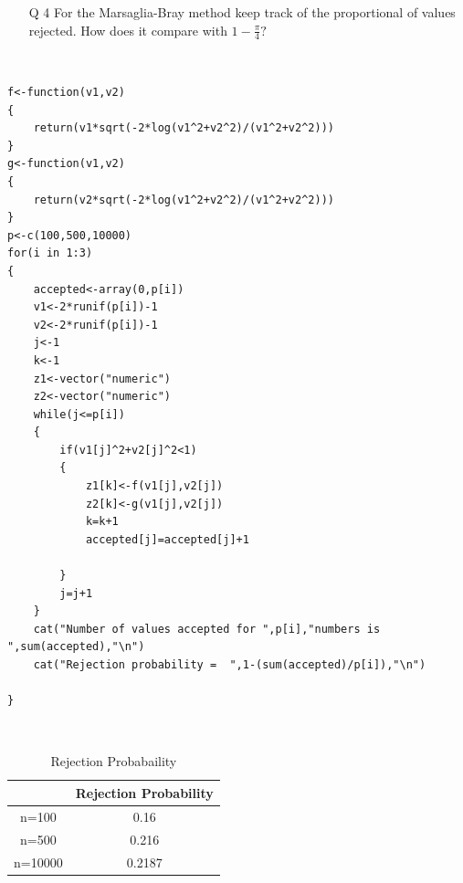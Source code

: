 \documentclass[12pt]{book}
\begin{document}
\newpage
\begin{enumerate}
\item[Q 4] For the Marsaglia-Bray method keep track of the proportional of values rejected. How does it compare with $1 - \frac{\pi}{4} ?$
\end{enumerate}
\\
\begin{lstlisting}
f<-function(v1,v2)
{
	return(v1*sqrt(-2*log(v1^2+v2^2)/(v1^2+v2^2)))
}
g<-function(v1,v2)
{
	return(v2*sqrt(-2*log(v1^2+v2^2)/(v1^2+v2^2)))
}
p<-c(100,500,10000)
for(i in 1:3)
{
	accepted<-array(0,p[i])
	v1<-2*runif(p[i])-1
	v2<-2*runif(p[i])-1
	j<-1
	k<-1
	z1<-vector("numeric")
	z2<-vector("numeric")
	while(j<=p[i])
	{
		if(v1[j]^2+v2[j]^2<1)
		{
			z1[k]<-f(v1[j],v2[j])
			z2[k]<-g(v1[j],v2[j])
			k=k+1
			accepted[j]=accepted[j]+1

		}
		j=j+1
	}
	cat("Number of values accepted for ",p[i],"numbers is ",sum(accepted),"\n")
	cat("Rejection probability =  ",1-(sum(accepted)/p[i]),"\n")

}
\end{lstlisting}
\newpage
{}\\
\begin{table}[h!]
\centering
\begin{tabular}{||c|c||}
\hline
&Rejection Probability \\
[0.5ex]
\hline\hline
n=100&0.16\\	
n=500&0.216\\
n=10000&0.2187\\
[1ex]
\hline
\end{tabular}
\caption{Rejection Probabaility}
\label{table:1}
\end{table}\\
\end{document}

